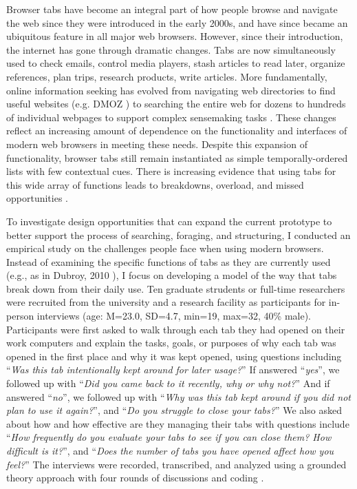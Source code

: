 Browser tabs have become an integral part of how people browse and navigate the web since they were introduced in the early 2000s, and have since became an ubiquitous feature in all major web browsers. However, since their introduction, the internet has gone through dramatic changes. Tabs are now simultaneously used to check emails, control media players, stash articles to read later, organize references, plan trips, research products, write articles. More fundamentally, online information seeking has evolved from navigating web directories to find useful websites (e.g. DMOZ \cite{dmoz}) to searching the entire web for dozens to hundreds of individual webpages to support complex sensemaking tasks \cite{pirolli1999information,marchionini2006exploratory}. These changes reflect an increasing amount of dependence on the functionality and interfaces of modern web browsers in meeting these needs.
Despite this expansion of functionality, browser tabs still remain instantiated as simple temporally-ordered lists with few contextual cues. 
There is increasing evidence that using tabs for this wide array of functions leads to breakdowns, overload, and missed opportunities \cite{web1, web2, web3, web4, web5}.

To investigate design opportunities that can expand the current prototype to better support the process of searching, foraging, and structuring, I conducted an empirical study on the challenges people face when using modern browsers. Instead of examining the specific functions of tabs as they are currently used (e.g., as in Dubroy, 2010 \cite{Dubroy:2010:STB:1753326.1753426}), I focus on developing a model of the way that tabs break down from their daily use. 
Ten graduate strudents or full-time researchers were recruited from the university and a research facility as participants for in-person interviews (age: M=23.0, SD=4.7, min=19, max=32, 40\% male).
Participants were first asked to walk through each tab they had opened on their work computers and explain the tasks, goals, or purposes of why each tab was opened in the first place and why it was kept opened, using questions including ``\emph{Was this tab intentionally kept around for later usage?}'' If answered ``\emph{yes}'', we followed up with ``\emph{Did you came back to it recently, why or why not?}'' And if answered ``\emph{no}'', we followed up with ``\emph{Why was this tab kept around if you did not plan to use it again?}'', and ``\emph{Do you struggle to close your tabs?}''  We also asked about how and how effective are they managing their tabs with questions include ``\emph{How frequently do you evaluate your tabs to see if you can close them? How difficult is it?}'', and ``\emph{Does the number of tabs you have opened affect how you feel?}'' The interviews were recorded, transcribed, and analyzed using a grounded theory approach with four rounds of discussions and coding \cite{strauss1998basics}.

